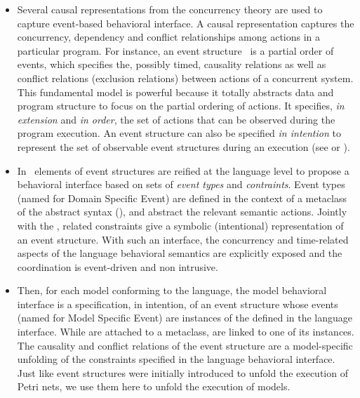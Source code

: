 \begin{itemize}
	    	\item Several causal representations from the concurrency theory are used to capture event-based behavioral interface. A causal representation captures the concurrency, dependency and conflict relationships among actions in a particular program. For instance, an event structure~\cite{eventStructures} is a partial order of events, which specifies the, possibly timed, causality relations as well as conflict relations (\ie exclusion relations) between actions of a concurrent system. This fundamental model is powerful because it totally abstracts data and program structure to focus on the partial ordering of actions. It specifies, \emph{in extension} and \emph{in order}, the set of actions that can be observed during the program execution. An event structure can also be specified \emph{in intention} to represent the set of observable event structures during an execution (see \eg\cite{tr:ccsl} or \cite{tagmachine}).
	    	
	    	\item In~\cite{sle13-combemale} elements of event structures are reified at the language level to propose a behavioral interface based on sets of \emph{event types} and \emph{contraints}. Event types (named \dse for Domain Specific Event) are defined in the context of a metaclass of the abstract syntax (\as), and abstract the relevant semantic actions. Jointly with the \dse, related constraints give a symbolic (intentional) representation of an event structure. With such an interface, the concurrency and time-related aspects of the language behavioral semantics are explicitly exposed and the coordination is event-driven and non intrusive.
	    	\item Then, for each model conforming to the language, the model behavioral interface is a specification, in intention, of an event structure whose events (named \mse for Model Specific Event) are instances of the \dse defined in the language interface. While \dse are attached to a metaclass, \mse are linked to one of its instances. The causality and conflict relations of the event structure are a model-specific unfolding of the constraints specified in the language behavioral interface. Just like event structures were initially introduced to unfold the execution of Petri nets, we use them here to unfold the execution of models.
	    	
	    	\end{itemize}
	    	
	    	
	    				
